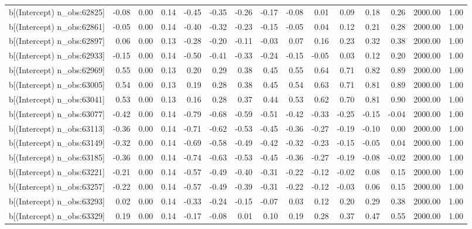 \begin{table}[ht]
\begin{tabular}{rrrrrrrrrrrrrrr}
  b[(Intercept) n\_obs:62825] & -0.08 & 0.00 & 0.14 & -0.45 & -0.35 & -0.26 & -0.17 & -0.08 & 0.01 & 0.09 & 0.18 & 0.26 & 2000.00 & 1.00 \\ 
  b[(Intercept) n\_obs:62861] & -0.05 & 0.00 & 0.14 & -0.40 & -0.32 & -0.23 & -0.15 & -0.05 & 0.04 & 0.12 & 0.21 & 0.28 & 2000.00 & 1.00 \\ 
  b[(Intercept) n\_obs:62897] & 0.06 & 0.00 & 0.13 & -0.28 & -0.20 & -0.11 & -0.03 & 0.07 & 0.16 & 0.23 & 0.32 & 0.38 & 2000.00 & 1.00 \\ 
  b[(Intercept) n\_obs:62933] & -0.15 & 0.00 & 0.14 & -0.50 & -0.41 & -0.33 & -0.24 & -0.15 & -0.05 & 0.03 & 0.12 & 0.20 & 2000.00 & 1.00 \\ 
  b[(Intercept) n\_obs:62969] & 0.55 & 0.00 & 0.13 & 0.20 & 0.29 & 0.38 & 0.45 & 0.55 & 0.64 & 0.71 & 0.82 & 0.89 & 2000.00 & 1.00 \\ 
  b[(Intercept) n\_obs:63005] & 0.54 & 0.00 & 0.13 & 0.19 & 0.28 & 0.38 & 0.45 & 0.54 & 0.63 & 0.71 & 0.81 & 0.89 & 2000.00 & 1.00 \\ 
  b[(Intercept) n\_obs:63041] & 0.53 & 0.00 & 0.13 & 0.16 & 0.28 & 0.37 & 0.44 & 0.53 & 0.62 & 0.70 & 0.81 & 0.90 & 2000.00 & 1.00 \\ 
  b[(Intercept) n\_obs:63077] & -0.42 & 0.00 & 0.14 & -0.79 & -0.68 & -0.59 & -0.51 & -0.42 & -0.33 & -0.25 & -0.15 & -0.04 & 2000.00 & 1.00 \\ 
  b[(Intercept) n\_obs:63113] & -0.36 & 0.00 & 0.14 & -0.71 & -0.62 & -0.53 & -0.45 & -0.36 & -0.27 & -0.19 & -0.10 & 0.00 & 2000.00 & 1.00 \\ 
  b[(Intercept) n\_obs:63149] & -0.32 & 0.00 & 0.14 & -0.69 & -0.58 & -0.49 & -0.42 & -0.32 & -0.23 & -0.15 & -0.05 & 0.04 & 2000.00 & 1.00 \\ 
  b[(Intercept) n\_obs:63185] & -0.36 & 0.00 & 0.14 & -0.74 & -0.63 & -0.53 & -0.45 & -0.36 & -0.27 & -0.19 & -0.08 & -0.02 & 2000.00 & 1.00 \\ 
  b[(Intercept) n\_obs:63221] & -0.21 & 0.00 & 0.14 & -0.57 & -0.49 & -0.40 & -0.31 & -0.22 & -0.12 & -0.02 & 0.08 & 0.15 & 2000.00 & 1.00 \\ 
  b[(Intercept) n\_obs:63257] & -0.22 & 0.00 & 0.14 & -0.57 & -0.49 & -0.39 & -0.31 & -0.22 & -0.12 & -0.03 & 0.06 & 0.15 & 2000.00 & 1.00 \\ 
  b[(Intercept) n\_obs:63293] & 0.02 & 0.00 & 0.14 & -0.33 & -0.24 & -0.15 & -0.07 & 0.03 & 0.12 & 0.20 & 0.29 & 0.38 & 2000.00 & 1.00 \\ 
  b[(Intercept) n\_obs:63329] & 0.19 & 0.00 & 0.14 & -0.17 & -0.08 & 0.01 & 0.10 & 0.19 & 0.28 & 0.37 & 0.47 & 0.55 & 2000.00 & 1.00 \\ 

\end{tabular}
\end{table}
